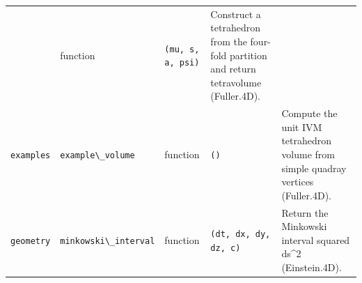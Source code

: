 \documentclass[
  10pt,
]{article}
\newcommand{\passthrough}[1]{#1}
\begin{document}
\begin{longtable}[]{@{}lllll@{}}
\begin{minipage}[t]{0.17\columnwidth}
\end{minipage} & \begin{minipage}[t]{0.17\columnwidth}\raggedright
function\strut
\end{minipage} & \begin{minipage}[t]{0.17\columnwidth}\raggedright
\passthrough{\lstinline!(mu, s, a, psi)!}\strut
\end{minipage} & \begin{minipage}[t]{0.17\columnwidth}\raggedright
Construct a tetrahedron from the four-fold partition and return
tetravolume (Fuller.4D).\strut
\end{minipage}\tabularnewline
\begin{minipage}[t]{0.17\columnwidth}\raggedright
\passthrough{\lstinline!examples!}\strut
\end{minipage} & \begin{minipage}[t]{0.17\columnwidth}\raggedright
\passthrough{\lstinline!example\_volume!}\strut
\end{minipage} & \begin{minipage}[t]{0.17\columnwidth}\raggedright
function\strut
\end{minipage} & \begin{minipage}[t]{0.17\columnwidth}\raggedright
\passthrough{\lstinline!()!}\strut
\end{minipage} & \begin{minipage}[t]{0.17\columnwidth}\raggedright
Compute the unit IVM tetrahedron volume from simple quadray vertices
(Fuller.4D).\strut
\end{minipage}\tabularnewline
\begin{minipage}[t]{0.17\columnwidth}\raggedright
\passthrough{\lstinline!geometry!}\strut
\end{minipage} & \begin{minipage}[t]{0.17\columnwidth}\raggedright
\passthrough{\lstinline!minkowski\_interval!}\strut
\end{minipage} & \begin{minipage}[t]{0.17\columnwidth}\raggedright
function\strut
\end{minipage} & \begin{minipage}[t]{0.17\columnwidth}\raggedright
\passthrough{\lstinline!(dt, dx, dy, dz, c)!}\strut
\end{minipage} & \begin{minipage}[t]{0.17\columnwidth}\raggedright
Return the Minkowski interval squared ds\^{}2 (Einstein.4D).\strut
\end{minipage}\tabularnewline

\end{longtable}
\end{document}
